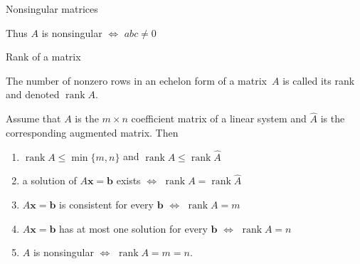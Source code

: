 \documentclass%
[handout]%
{beamer}
\newcommand{\rank}{\operatorname{rank}}
\newcommand{\bb}{{\mathbf b}}
\newcommand{\bx}{{\mathbf x}}
\begin{document}
\begin{frame}[label=singular]{Nonsingular matrices}
\begin{example}
 \vspace*{-13pt}

 Thus $A$ is nonsingular $\iff$ $abc\ne0$
 \end{example}

\end{frame}




\begin{frame}[label=rank]{Rank of a matrix}

  \begin{definition}
    The number of nonzero rows in an echelon form of a matrix~$A$ is called its \alert{rank}
    and denoted $\rank A$.
  \end{definition}

 \begin{theorem}
  Assume that $A$ is the $m\times n$ coefficient matrix of a linear system and $\hat A$ is the corresponding
  augmented matrix. Then
  \begin{enumerate}
   \item  $\rank A \le \min\{m,n\}$ and $\rank A \le \rank \hat A$
   \item a solution of $A\bx = \bb$ exists $\iff$ $\rank A = \rank \hat A$
   \item $A\bx = \bb$ is consistent for every $\bb$ $\iff$ $\rank A = m$
   \item $A\bx = \bb$ has at most one solution for every $\bb$ $\iff$ $\rank A =n$
   \item $A$ is nonsingular $\iff$ $\rank A = m = n$.
  \end{enumerate}
 \end{theorem}

\end{frame}
\end{document}
